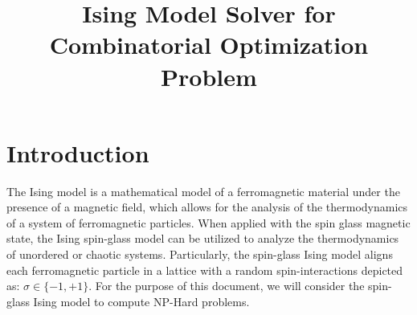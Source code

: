 \documentclass[conference]{IEEEtran}
\begin{document}
\title{Ising Model Solver for Combinatorial Optimization Problem}

\author{
\and
{}
}

\maketitle

\section{Introduction}
The Ising model is a mathematical model of a ferromagnetic material under the presence of a magnetic field, which allows for the analysis of the thermodynamics of a system of ferromagnetic particles\cite{b1}. When applied with the spin glass magnetic state, the Ising spin-glass model can be utilized to analyze the thermodynamics of unordered or chaotic systems. Particularly, the spin-glass Ising model aligns each ferromagnetic particle in a lattice with a random spin-interactions depicted as: $\sigma \in \{-1, +1\}$. For the purpose of this document, we will consider the spin-glass Ising model to compute NP-Hard problems.
\end{document}
